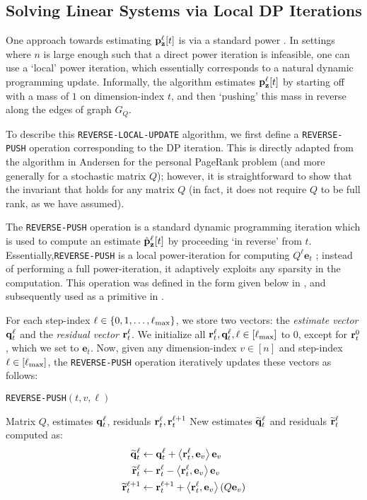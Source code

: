\subsection{Solving Linear Systems via Local DP Iterations}
\label{ssec:reverse}

One approach towards estimating ${\mathbf{p}}_\mathbf{z}^{\ell}[t]$ is via a standard power . 
In settings where $n$ is large enough such that a direct power iteration is infeasible, one can use a `local' power iteration, which essentially corresponds to a natural dynamic programming update. Informally, the algorithm estimates ${\mathbf{p}}_\mathbf{z}^{\ell}[t]$ by starting off with a mass of $1$ on dimension-index $t$, and then `pushing' this mass in reverse along the edges of graph $G_Q$. 

To describe this \texttt{REVERSE-LOCAL-UPDATE} algorithm, we first define a \texttt{REVERSE-PUSH} operation corresponding to the DP iteration. 
This is directly adapted from the algorithm in Andersen \cite{andersen2007local} for the personal PageRank problem (and more generally for a stochastic matrix $Q$); however, it is straightforward to show that the invariant that holds for any matrix $Q$ (in fact, it does not require $Q$ to be full rank, as we have assumed).
 
The \texttt{REVERSE-PUSH} operation is a standard dynamic programming iteration which is used to compute an estimate $\hat{\mathbf{p}}_\mathbf{z}^{\ell}[t]$ by proceeding `in reverse' from $t$. 
Essentially,\texttt{REVERSE-PUSH} is a local power-iteration for computing $Q^{\ell}\mathbf{e}_t$ ; instead of performing a full power-iteration, it adaptively exploits any sparsity in the computation.
This operation was defined in the form given below in \cite{andersen2007local}, and subsequently used as a primitive in \cite{banerjee2015fast, lee2014asynchronous}.


For each step-index $\ell\in\{0,1,\ldots,\ell_{\max}\}$, we store two vectors: the \emph{estimate vector} $\mathbf{q}^{\ell}_t$ and the \emph{residual vector} $\mathbf{r}^{\ell}_t$.
We initialize all $\mathbf{r}^{\ell}_t,\mathbf{q}^{\ell}_t, \ell\in[\ell_{\max}]$ to $0$, except for $\mathbf{r}^{0}_t$, which we set to $\mathbf{e}_t$.
Now, given any dimension-index $v\in[n]$ and step-index $\ell\in[\ell_{\max}]$, the \texttt{REVERSE-PUSH} operation iteratively updates these vectors as follows:
\begin{algorithm}[!ht]
\caption{\texttt{REVERSE-PUSH}$(t,v,\ell)$}
\label{alg:push}
\begin{algorithmic}[1]
\REQUIRE Matrix $Q$, estimates $\mathbf{q}^{\ell}_t$, residuals $\mathbf{r}^{\ell}_t,\mathbf{r}^{\ell+1}_t$
\RETURN New estimates $\widetilde{\mathbf{q}}^{\ell}_t$ and residuals $\widetilde{\mathbf{r}}^{\ell}_t$ computed as:
\begin{align*}
	\widetilde{\mathbf{q}}^{\ell}_t &\leftarrow \mathbf{q}^{\ell}_t + \left< \mathbf{r}^{\ell}_t, \mathbf{e}_v \right>\mathbf{e}_v \\
	\widetilde{\mathbf{r}}^{\ell}_t &\leftarrow \mathbf{r}^{\ell}_t - \left< \mathbf{r}^{\ell}_t, \mathbf{e}_v \right>\mathbf{e}_v \\
	\widetilde{\mathbf{r}}^{\ell+1}_t &\leftarrow \mathbf{r}^{\ell+1}_t + \left< \mathbf{r}^{\ell}_t, \mathbf{e}_v \right>(Q\mathbf{e}_v)
\end{align*}	
\end{algorithmic}
\end{algorithm}    

